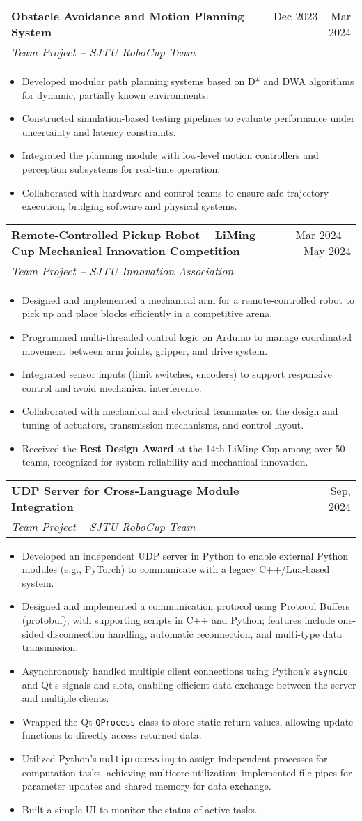 \documentclass[letterpaper,11pt]{article}
\makeatletter
\newcommand{\resumeItem}[1]{\item\small{
  {#1 \vspace{-2pt}}
}}
\newcommand{\resumeSubheading}[4]{
  \vspace{-1pt}\item
  \begin{tabular*}{\textwidth}[t]{l@{\extracolsep{\fill}}r}
    \textbf{#1} & #2 \\
    \textit{\small#3} & \textit{\small #4} \\
  \end{tabular*}\vspace{-5pt}
}
\newcommand{\resumeItemListStart}{\begin{itemize}}
\newcommand{\resumeItemListEnd}{\end{itemize}}
\makeatother
\begin{document}
\resumeSubheading
{Obstacle Avoidance and Motion Planning System}{Dec 2023 – Mar 2024}
{Team Project – SJTU RoboCup Team}{}
\resumeItemListStart
\resumeItem{Developed modular path planning systems based on D* and DWA algorithms for dynamic, partially known environments.}
\resumeItem{Constructed simulation-based testing pipelines to evaluate performance under uncertainty and latency constraints.}
\resumeItem{Integrated the planning module with low-level motion controllers and perception subsystems for real-time operation.}
\resumeItem{Collaborated with hardware and control teams to ensure safe trajectory execution, bridging software and physical systems.}
\resumeItemListEnd


\resumeSubheading
{Remote-Controlled Pickup Robot – LiMing Cup Mechanical Innovation Competition}{Mar 2024 – May 2024}
{Team Project – SJTU Innovation Association}{}
\resumeItemListStart
\resumeItem{Designed and implemented a mechanical arm for a remote-controlled robot to pick up and place blocks efficiently in a competitive arena.}
\resumeItem{Programmed multi-threaded control logic on Arduino to manage coordinated movement between arm joints, gripper, and drive system.}
\resumeItem{Integrated sensor inputs (limit switches, encoders) to support responsive control and avoid mechanical interference.}
\resumeItem{Collaborated with mechanical and electrical teammates on the design and tuning of actuators, transmission mechanisms, and control layout.}
\resumeItem{Received the \textbf{Best Design Award} at the 14th LiMing Cup among over 50 teams, recognized for system reliability and mechanical innovation.}
\resumeItemListEnd

\resumeSubheading
{UDP Server for Cross-Language Module Integration}{Sep, 2024}
{Team Project – SJTU RoboCup Team}{}
\resumeItemListStart
\resumeItem{Developed an independent UDP server in Python to enable external Python modules (e.g., PyTorch) to communicate with a legacy C++/Lua-based system.}
\resumeItem{Designed and implemented a communication protocol using Protocol Buffers (protobuf), with supporting scripts in C++ and Python; features include one-sided disconnection handling, automatic reconnection, and multi-type data transmission.}
\resumeItem{Asynchronously handled multiple client connections using Python’s \texttt{asyncio} and Qt’s signals and slots, enabling efficient data exchange between the server and multiple clients.}
\resumeItem{Wrapped the Qt \texttt{QProcess} class to store static return values, allowing update functions to directly access returned data.}
\resumeItem{Utilized Python’s \texttt{multiprocessing} to assign independent processes for computation tasks, achieving multicore utilization; implemented file pipes for parameter updates and shared memory for data exchange.}
\resumeItem{Built a simple UI to monitor the status of active tasks.}
\resumeItemListEnd
\end{document}
